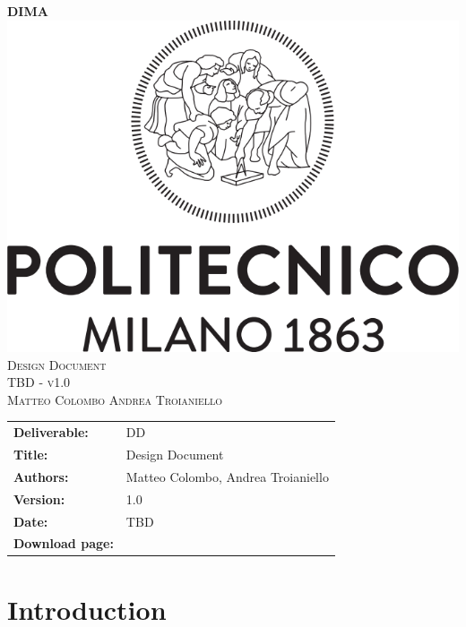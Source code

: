 
\usepackage{float}
\usepackage[section]{placeins}


\begin{titlepage}
	\begin{center}
		\Huge{\bfseries{DIMA}}\\
		[3cm]
		\includegraphics[scale=0.3]{Images/polimi}\\
		[3cm]
		\textsc{\Huge Design Document}\\[1cm]
		\textsc{\huge TBD - v1.0}\\
		[4cm]
		\textsc{\normalsize Matteo Colombo \hspace{0.4cm} Andrea Troianiello }
	\end{center}
\end{titlepage}
	
\begin{table}[h!]
\begin{tabu} to \textwidth { X[0.3,r,p] X[0.7,l,p] }
\hline

\textbf{Deliverable:} & DD\\
\textbf{Title:} & Design Document \\
\textbf{Authors:} & Matteo Colombo, Andrea Troianiello \\
\textbf{Version:} & 1.0 \\ 
\textbf{Date:} & TBD \\
\textbf{Download page:} & \href{https://github.com/MatteoColombo/dima-2018-colombo-troianiello}{\color{Black}{GitHub - DIMA-2018-Colombo-Troianiello repository}} \\
\hline
\end{tabu}
\end{table}

\clearpage
\tableofcontents
\listoffigures
\listoftables



\clearpage
{\section{Introduction}}
\label{sect:introduction}


